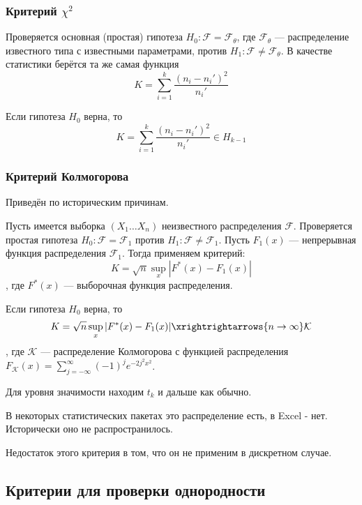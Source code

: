 \subsubsection{Критерий \(\chi^2\)}

Проверяется основная (простая) гипотеза \(H_0 : \mathcal{F} = \mathcal{F}_\theta\), где \(\mathcal{F}_\theta\) --- распределение известного типа с известными параметрами, против \(H_1 : \mathcal{F} \neq \mathcal{F}_\theta\). В качестве статистики берётся та же самая функция
\[K = \sum_{i=1}^{k} \frac{(n_i - n_i')^2}{n_i'}\]

\begin{theorem}[Парона\?]
    Если гипотеза \(H_0\) верна, то
    \[K = \sum_{i=1}^{k} \frac{(n_i - n_i')^2}{n_i'} \in H_{k - 1}\]
\end{theorem}


\subsubsection{Критерий Колмогорова}

Приведён по историческим причинам.

Пусть имеется выборка \((X_1 \dots X_n)\) неизвестного распределения \(\mathcal{F}\). Проверяется простая гипотеза \(H_0 : \mathcal{F} = \mathcal{F}_1\) против \(H_1 : \mathcal{F} \neq \mathcal{F}_1\). Пусть \(F_1(x)\) --- непрерывная функция распределения \(\mathcal{F}_1\). Тогда применяем критерий:
\[K = \sqrt{n} \sup_x |F^*(x) - F_1(x)|\]
, где \(F^*(x)\) --- выборочная функция распределения.

\begin{theorem}
    Если гипотеза \(H_0\) верна, то
    \[K = \sqrt{n} \sup_x |F^*(x) - F_1(x)| \xrightrightarrows{n \to \infty} \mathcal{K}\]
    , где \(\mathcal{K}\) --- распределение Колмогорова с функцией распределения \(F_{\mathcal{K}}(x) = \sum_{j=- \infty }^{\infty} ( - 1)^j e^{ - 2j^2x^2}\).
\end{theorem}

Для уровня значимости находим \(t_k\) и дальше как обычно.

В некоторых статистических пакетах это распределение есть, в Excel - нет. Исторически оно не распространилось.

Недостаток этого критерия в том, что он не применим в дискретном случае.

\subsection{Критерии для проверки однородности}

